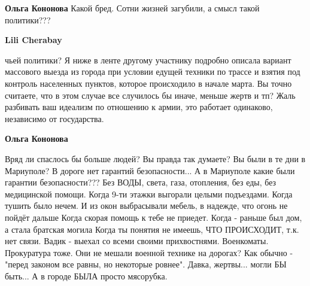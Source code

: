 \begin{itemize}
\textbf{Ольга Кононова} Какой бред. Сотни жизней загубили, а смысл такой политики???

\textbf{Lili Cherabay} 

чьей политики? Я ниже в ленте другому участнику подробно описала вариант
массового выезда из города при условии едущей техники по трассе и взятия под
контроль населенных пунктов, которое происходило в начале марта. Вы точно
считаете, что в этом случае все случилось бы иначе, меньше жертв и тп? Жаль
разбивать ваш идеализм по отношению к армии, это работает одинаково, независимо
от государства.


\end{itemize} %

\textbf{Ольга Кононова}

\obeycr
Вряд ли спаслось бы больше людей?
Вы правда так думаете?
Вы были в те дни в Мариуполе?
В дороге нет гарантий безопасности...
А в Мариуполе какие были гарантии безопасности???
Без ВОДЫ, света, газа, отопления, без еды, без медицинской помощи.
Когда 9-ти этажки выгорали целыми подъездами. Когда тушить было нечем. И из окон выбрасывали мебель, в надежде, что огонь не пойдёт дальше
Когда скорая помощь к тебе не приедет.
Когда - раньше был дом, а стала братская могила
Когда ты понятия не имеешь, ЧТО ПРОИСХОДИТ, т.к. нет связи.
Вадик - выехал со всеми своими прихвостнями. Военкоматы. Прокуратура тоже. Они не мешали военной технике на дорогах?
Как обычно - "перед законом все равны, но некоторые ровнее".
Давка, жертвы... могли БЫ быть...
А в городе БЫЛА просто мясорубка.
\restorecr

